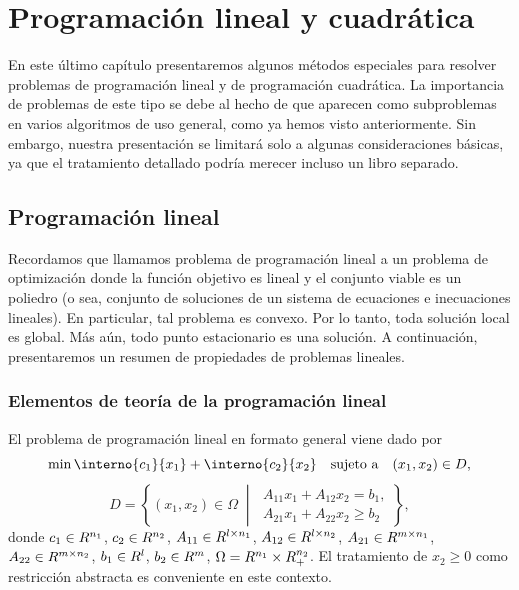 
\chapter{Programación lineal y cuadrática}
\label{v2:chap:6}

En este último capítulo presentaremos algunos métodos especiales para resolver problemas de programación lineal y de programación cuadrática. La importancia de problemas de este tipo se debe al hecho de que aparecen como subproblemas en varios algoritmos de uso general, como ya hemos visto anteriormente. Sin embargo, nuestra presentación se limitará solo a algunas consideraciones básicas, ya que el tratamiento detallado podría merecer incluso un libro separado.

\section{Programación lineal}
\label{v2:sec:6.1}

Recordamos que llamamos problema de programación lineal a un problema de optimización donde la función objetivo es lineal y el conjunto viable es un poliedro (o sea, conjunto de soluciones de un sistema de ecuaciones e inecuaciones lineales). En particular, tal problema es convexo. Por lo tanto, toda solución local es global. Más aún, todo punto estacionario es una solución. A continuación, presentaremos un resumen de propiedades de problemas lineales.

\subsection{Elementos de teoría de la programación lineal}
\label{v2:sec:6.1.1}

El problema de programación lineal en formato general viene dado por
\begin{equation}
    \min \interno{c_1}{x_1} + \interno{c_2}{x_2} \quad \text{sujeto a} \quad (x_1, x_2) \in D,
    \label{v2:eq:6.1}
\end{equation}
\begin{equation}
    D = \left\{ (x_1, x_2) \in \Omega \;\middle|\; \begin{array}{l} A_{11}x_1 + A_{12}x_2 = b_1, \\ A_{21}x_1 + A_{22}x_2 \ge b_2 \end{array} \right\},
    \label{v2:eq:6.2}
\end{equation}
donde $c_1 \in R^{n_1}$, $c_2 \in R^{n_2}$, $A_{11} \in R^{l \times n_1}$, $A_{12} \in R^{l \times n_2}$, $A_{21} \in R^{m \times n_1}$, $A_{22} \in R^{m \times n_2}$, $b_1 \in R^l$, $b_2 \in R^m$, $\Omega = R^{n_1} \times R^{n_2}_+$.
El tratamiento de $x_2 \ge 0$ como restricción abstracta es conveniente en este contexto.

